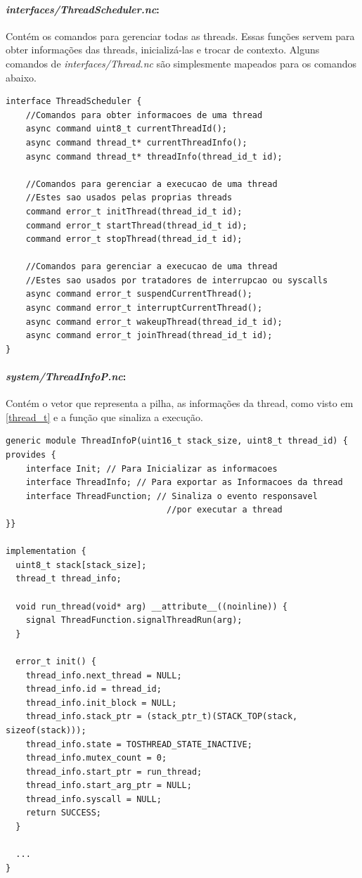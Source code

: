 \paragraph{\textit{interfaces/ThreadScheduler.nc}:} Contém os comandos para gerenciar todas as threads. Essas funções
servem para obter informações das threads, inicializá-las e trocar de contexto.
Alguns comandos de \textit{interfaces/Thread.nc} são simplesmente mapeados para os comandos abaixo.
\begin{lstlisting}
interface ThreadScheduler {
    //Comandos para obter informacoes de uma thread
    async command uint8_t currentThreadId();
    async command thread_t* currentThreadInfo();
    async command thread_t* threadInfo(thread_id_t id);

    //Comandos para gerenciar a execucao de uma thread
    //Estes sao usados pelas proprias threads
    command error_t initThread(thread_id_t id);
    command error_t startThread(thread_id_t id);
    command error_t stopThread(thread_id_t id);

    //Comandos para gerenciar a execucao de uma thread
    //Estes sao usados por tratadores de interrupcao ou syscalls
    async command error_t suspendCurrentThread();
    async command error_t interruptCurrentThread();
    async command error_t wakeupThread(thread_id_t id);
    async command error_t joinThread(thread_id_t id);
}
\end{lstlisting}

\paragraph{\textit{system/ThreadInfoP.nc}:}\label{ThreadInfoP} Contém o vetor que representa a pilha, as informações da thread,
como visto em \ref{thread_t} e a função que sinaliza a execução.
\begin{lstlisting}
generic module ThreadInfoP(uint16_t stack_size, uint8_t thread_id) { 
provides {
    interface Init; // Para Inicializar as informacoes
    interface ThreadInfo; // Para exportar as Informacoes da thread
    interface ThreadFunction; // Sinaliza o evento responsavel 
                                //por executar a thread 
}}

implementation {
  uint8_t stack[stack_size];
  thread_t thread_info;

  void run_thread(void* arg) __attribute__((noinline)) {
    signal ThreadFunction.signalThreadRun(arg);
  }
  
  error_t init() {
    thread_info.next_thread = NULL;
    thread_info.id = thread_id;
    thread_info.init_block = NULL;
    thread_info.stack_ptr = (stack_ptr_t)(STACK_TOP(stack, sizeof(stack)));
    thread_info.state = TOSTHREAD_STATE_INACTIVE;
    thread_info.mutex_count = 0;
    thread_info.start_ptr = run_thread;
    thread_info.start_arg_ptr = NULL;
    thread_info.syscall = NULL;
    return SUCCESS;
  }

  ... 
}
\end{lstlisting} 

